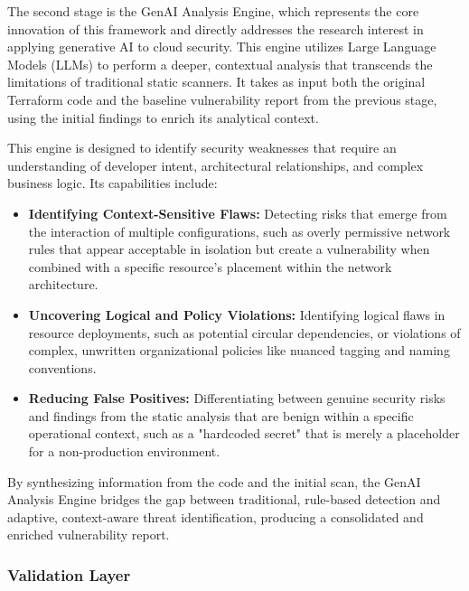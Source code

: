 The second stage is the GenAI Analysis Engine, which represents the core innovation of this framework and directly addresses the research interest in applying generative AI to cloud security. This engine utilizes Large Language Models (LLMs) to perform a deeper, contextual analysis that transcends the limitations of traditional static scanners\cite{hayagreevan_security_2024, ling_enhancing_2024}. It takes as input both the original Terraform code and the baseline vulnerability report from the previous stage, using the initial findings to enrich its analytical context.


This engine is designed to identify security weaknesses that require an understanding of developer intent, architectural relationships, and complex business logic\cite{noseevich_towards_2015}. Its capabilities include:

\begin{itemize}
    \item \textbf{Identifying Context-Sensitive Flaws:} Detecting risks that emerge from the interaction of multiple configurations, such as overly permissive network rules that appear acceptable in isolation but create a vulnerability when combined with a specific resource's placement within the network architecture\cite{noseevich_towards_2015}.
    \item \textbf{Uncovering Logical and Policy Violations:} Identifying logical flaws in resource deployments, such as potential circular dependencies, or violations of complex, unwritten organizational policies like nuanced tagging and naming conventions.
    \item \textbf{Reducing False Positives:} Differentiating between genuine security risks and findings from the static analysis that are benign within a specific operational context, such as a "hardcoded secret" that is merely a placeholder for a non-production environment.
\end{itemize}

By synthesizing information from the code and the initial scan, the GenAI Analysis Engine bridges the gap between traditional, rule-based detection and adaptive, context-aware threat identification, producing a consolidated and enriched vulnerability report.


\subsubsection{Validation Layer} %
\label{sec:Validation Layer}

